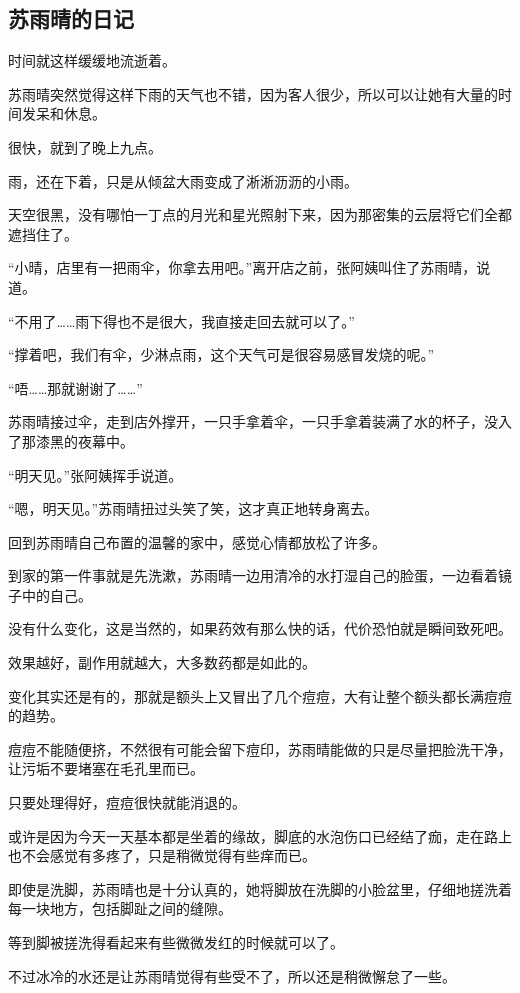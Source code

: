 \subsection{苏雨晴的日记}

时间就这样缓缓地流逝着。

苏雨晴突然觉得这样下雨的天气也不错，因为客人很少，所以可以让她有大量的时间发呆和休息。

很快，就到了晚上九点。

雨，还在下着，只是从倾盆大雨变成了淅淅沥沥的小雨。

天空很黑，没有哪怕一丁点的月光和星光照射下来，因为那密集的云层将它们全都遮挡住了。

“小晴，店里有一把雨伞，你拿去用吧。”离开店之前，张阿姨叫住了苏雨晴，说道。

“不用了……雨下得也不是很大，我直接走回去就可以了。”

“撑着吧，我们有伞，少淋点雨，这个天气可是很容易感冒发烧的呢。”

“唔……那就谢谢了……”

苏雨晴接过伞，走到店外撑开，一只手拿着伞，一只手拿着装满了水的杯子，没入了那漆黑的夜幕中。

“明天见。”张阿姨挥手说道。

“嗯，明天见。”苏雨晴扭过头笑了笑，这才真正地转身离去。

回到苏雨晴自己布置的温馨的家中，感觉心情都放松了许多。

到家的第一件事就是先洗漱，苏雨晴一边用清冷的水打湿自己的脸蛋，一边看着镜子中的自己。

没有什么变化，这是当然的，如果药效有那么快的话，代价恐怕就是瞬间致死吧。

效果越好，副作用就越大，大多数药都是如此的。

变化其实还是有的，那就是额头上又冒出了几个痘痘，大有让整个额头都长满痘痘的趋势。

痘痘不能随便挤，不然很有可能会留下痘印，苏雨晴能做的只是尽量把脸洗干净，让污垢不要堵塞在毛孔里而已。

只要处理得好，痘痘很快就能消退的。

或许是因为今天一天基本都是坐着的缘故，脚底的水泡伤口已经结了痂，走在路上也不会感觉有多疼了，只是稍微觉得有些痒而已。

即使是洗脚，苏雨晴也是十分认真的，她将脚放在洗脚的小脸盆里，仔细地搓洗着每一块地方，包括脚趾之间的缝隙。

等到脚被搓洗得看起来有些微微发红的时候就可以了。

不过冰冷的水还是让苏雨晴觉得有些受不了，所以还是稍微懈怠了一些。

